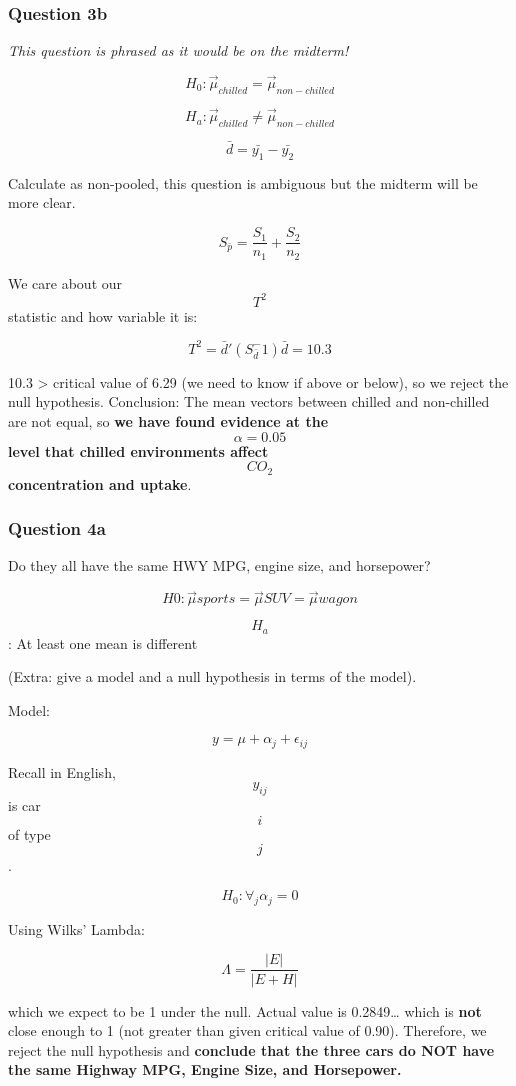 \documentclass[]{article}
\begin{document}
\hypertarget{question-3b}{%
\subsubsection{Question 3b}\label{question-3b}}

\emph{This question is phrased as it would be on the midterm!}

\[H_0: \vec{\mu}_{chilled} = \vec{\mu}_{non-chilled}\]

\[H_a: \vec{\mu}_{chilled} \ne \vec{\mu}_{non-chilled}\]

\[\bar{d} = \bar{y_1} - \bar{y_2}\]

Calculate as non-pooled, this question is ambiguous but the midterm will
be more clear.

\[S_{\bar{p}} = \frac{S_1}{n_1} + \frac{S_2}{n_2}\]

We care about our \[T^2\] statistic and how variable it is:

\[T^2 = \bar{d}'(S_{\bar{d}}^-1)\bar{d} = 10.3\]

10.3 \textgreater{} critical value of 6.29 (we need to know if above or
below), so we reject the null hypothesis. Conclusion: The mean vectors
between chilled and non-chilled are not equal, so \textbf{we have found
evidence at the} \[\alpha = 0.05\] \textbf{level that chilled
environments affect} \[CO_2\] \textbf{concentration and uptake}.

\hypertarget{question-4a}{%
\subsubsection{Question 4a}\label{question-4a}}

Do they all have the same HWY MPG, engine size, and horsepower?

\[H0: \vec{\mu}{sports} = \vec{\mu}{SUV} = \vec{\mu}{wagon}\]

\[H_a\]: At least one mean is different

(Extra: give a model and a null hypothesis in terms of the model).

Model:

\[y = \mu + \alpha_j + \epsilon_{ij}\]

Recall in English, \[y_{ij}\] is car \[i\] of type \[j\].

\[H_0: \forall_j \alpha_j = 0\]

Using Wilks' Lambda:

\[\Lambda = \frac{| E |}{| E + H|}\]

which we expect to be 1 under the null. Actual value is 0.2849\ldots{}
which is \textbf{not} close enough to 1 (not greater than given critical
value of 0.90). Therefore, we reject the null hypothesis and
\textbf{conclude that the three cars do NOT have the same Highway MPG,
Engine Size, and Horsepower.}
\end{document}
